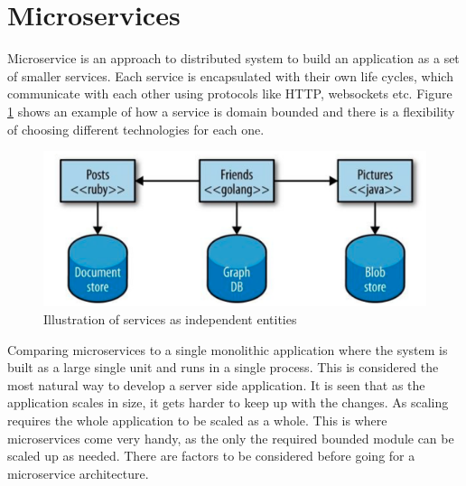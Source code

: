 \newpage
\section{Microservices}

Microservice is an approach to distributed system to build an application
as a set of smaller services. Each service is encapsulated with their own
life cycles, which communicate with each other using protocols like HTTP, 
websockets etc. Figure \ref{fig:serviceExample} shows an example of how 
a service is domain bounded and there is a flexibility of choosing different
technologies for each one. \cite{MicroserviceNewMan}

\begin{figure}[htbp!]
    \centering \includegraphics[scale=0.3]{grafiken/microservices.png}
    \caption{ Illustration of services as independent entities \cite{MicroserviceNewMan}}
    \label{fig:serviceExample}
\end{figure}

\par
    Comparing microservices to a single monolithic application where the
    system is built as a large single unit and runs in a single process. 
    This is considered the most natural way to develop a server side 
    application. It is seen that as the application scales in size, it 
    gets harder to keep up with the changes. As scaling requires the whole
    application to be scaled as a whole. This is where microservices come very handy,
    as the only the required bounded module can be scaled up as needed. 
    There are factors to be considered before going for a microservice
    architecture.


